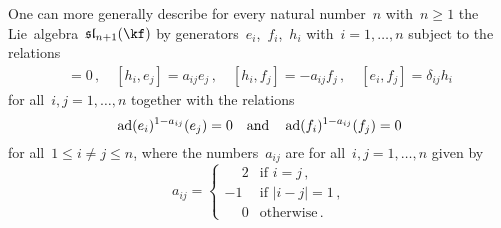 \begin{remark}
  One can more generally describe for every natural number~$n$ with~$n \geq 1$ the Lie~algebra~$\sllie_{n+1}(\kf)$ by generators~$e_i$,~$f_i$,~$h_i$ with~$i = 1, \dotsc, n$ subject to the relations
  \begin{align*}
    [h_i, h_j] = 0  \,,
    \quad
    [h_i, e_j] = a_{ij} e_j \,,
    \quad
    [h_i, f_j] = -a_{ij}f_j  \,,
    \quad
    [e_i, f_j] = \delta_{ij} h_i
  \end{align*}
  for all~$i,j = 1, \dotsc, n$ together with the relations
  \[
    \operatorname{ad}(e_i)^{1-a_{ij}}(e_j) = 0
    \quad\text{and}\quad
    \operatorname{ad}(f_i)^{1-a_{ij}}(f_j) = 0
  \]
  for all~$1 \leq i \neq j \leq n$, where the numbers~$a_{ij}$ are for all~$i,j = 1, \dotsc, n$ given by
  \[
    a_{ij} =
    \begin{cases}
    \phantom{-}2 & \text{if $i = j$}  \,, \\
              -1 & \text{if $|i-j| = 1$}  \,, \\
    \phantom{-}0 & \text{otherwise} \,.
    \end{cases}
  \]
\end{remark}


